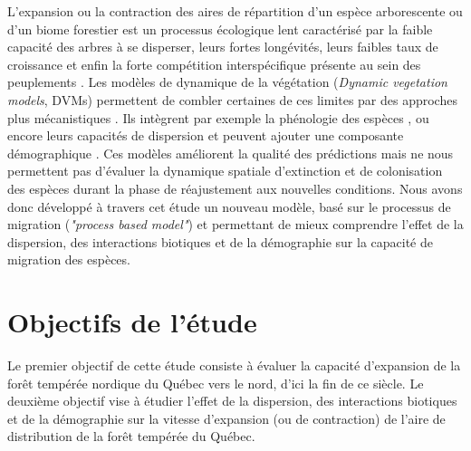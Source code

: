L'expansion ou la contraction des aires de répartition d'un espèce arborescente ou d'un biome
forestier est un processus écologique lent caractérisé par la faible capacité des arbres à se
disperser, leurs fortes longévités, leurs faibles taux de croissance et enfin la forte compétition
interspécifique présente au sein des peuplements \citep{Renwick2014,Vanderwel2014}. Les modèles de
dynamique de la végétation (\textit{Dynamic vegetation models}, DVMs) permettent de combler
certaines de ces limites par des approches plus mécanistiques \citep{Snell2014a}. Ils intègrent par
exemple la phénologie des espèces \citep{Letters2001,Morin2008}, ou encore leurs capacités de
dispersion \citep{Nobis2014,Iverson2004} et peuvent ajouter une composante démographique
\citep{Lischke2006a,Vanderwel2014}. Ces modèles améliorent la qualité des prédictions mais ne nous
permettent pas d'évaluer la dynamique spatiale d'extinction et de colonisation des espèces durant la
phase de réajustement aux nouvelles conditions. Nous avons donc développé à travers cet étude un
nouveau modèle, basé sur le processus de migration (\textit{"process based model"}) et permettant de
mieux comprendre l'effet de la dispersion, des interactions biotiques et de la démographie sur la
capacité de migration des espèces.

\section*{Objectifs de l'étude}

Le premier objectif de cette étude consiste à évaluer la capacité d'expansion de la forêt tempérée nordique du Québec vers le nord, d'ici la fin de ce siècle. Le deuxième objectif vise à
étudier l'effet de la dispersion, des interactions biotiques et de la démographie sur la vitesse
d'expansion (ou de contraction) de l'aire de distribution de la forêt tempérée du Québec.

